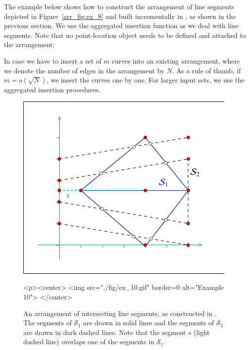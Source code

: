 The example below shows how to construct the arrangement of
line segments depicted in Figure~\ref{arr_fig:ex_8} and built
incrementally in , as shown in the previous
section. We use the aggregated insertion function
 as we deal with line segments.
Note that no point-location object needs to be defined and attached to the
arrangement:


In case we have to insert a set of $m$ curves into an existing
arrangement, where we denote the number of edges in the arrangement by $N$.
As a rule of thumb, if $m = o(\sqrt{N})$, we insert the curves one by
one. For larger input sets, we use the aggregated insertion procedures.

\begin{figure}[t]
\begin{ccTexOnly}
  \begin{center}
  \includegraphics{Arrangement_on_surface_2/fig/ex_10}
  \end{center}
\end{ccTexOnly}
\begin{ccHtmlOnly}
  <p><center>
  <img src="./fig/ex_10.gif" border=0 alt="Example 10">
  </center>
\end{ccHtmlOnly}
\caption{An arrangement of intersecting line segments, as
constructed in . The segments of ${\mathcal S}_1$
are drawn in solid lines and the segments of ${\mathcal S}_2$ are
drawn in dark dashed lines. Note that the segment $s$ (light
dashed line) overlaps one of the segments in
${\mathcal S}_1$.\label{arr_fig:ex_10}}
\end{figure}


